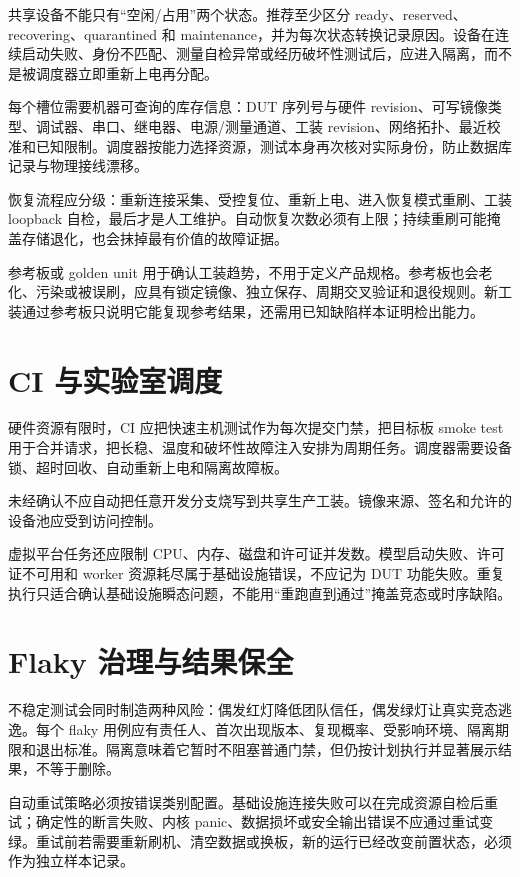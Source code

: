 共享设备不能只有“空闲/占用”两个状态。推荐至少区分 ready、reserved、recovering、quarantined 和 maintenance，并为每次状态转换记录原因。设备在连续启动失败、身份不匹配、测量自检异常或经历破坏性测试后，应进入隔离，而不是被调度器立即重新上电再分配。

每个槽位需要机器可查询的库存信息：DUT 序列号与硬件 revision、可写镜像类型、调试器、串口、继电器、电源/测量通道、工装 revision、网络拓扑、最近校准和已知限制。调度器按能力选择资源，测试本身再次核对实际身份，防止数据库记录与物理接线漂移。

恢复流程应分级：重新连接采集、受控复位、重新上电、进入恢复模式重刷、工装 loopback 自检，最后才是人工维护。自动恢复次数必须有上限；持续重刷可能掩盖存储退化，也会抹掉最有价值的故障证据。

参考板或 golden unit 用于确认工装趋势，不用于定义产品规格。参考板也会老化、污染或被误刷，应具有锁定镜像、独立保存、周期交叉验证和退役规则。新工装通过参考板只说明它能复现参考结果，还需用已知缺陷样本证明检出能力。

\section{CI 与实验室调度}

硬件资源有限时，CI 应把快速主机测试作为每次提交门禁，把目标板 smoke test 用于合并请求，把长稳、温度和破坏性故障注入安排为周期任务。调度器需要设备锁、超时回收、自动重新上电和隔离故障板。

未经确认不应自动把任意开发分支烧写到共享生产工装。镜像来源、签名和允许的设备池应受到访问控制。

虚拟平台任务还应限制 CPU、内存、磁盘和许可证并发数。模型启动失败、许可证不可用和 worker 资源耗尽属于基础设施错误，不应记为 DUT 功能失败。重复执行只适合确认基础设施瞬态问题，不能用“重跑直到通过”掩盖竞态或时序缺陷。

\section{Flaky 治理与结果保全}

不稳定测试会同时制造两种风险：偶发红灯降低团队信任，偶发绿灯让真实竞态逃逸。每个 flaky 用例应有责任人、首次出现版本、复现概率、受影响环境、隔离期限和退出标准。隔离意味着它暂时不阻塞普通门禁，但仍按计划执行并显著展示结果，不等于删除。

自动重试策略必须按错误类别配置。基础设施连接失败可以在完成资源自检后重试；确定性的断言失败、内核 panic、数据损坏或安全输出错误不应通过重试变绿。重试前若需要重新刷机、清空数据或换板，新的运行已经改变前置状态，必须作为独立样本记录。

